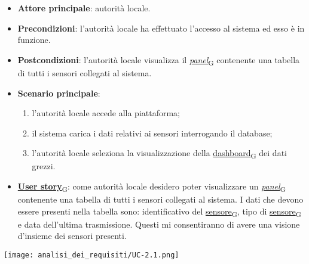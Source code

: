 \begin{itemize}
	\item \textbf{Attore principale}: autorità locale.
	\item \textbf{Precondizioni}: l'autorità locale ha effettuato l'accesso al sistema ed esso è in funzione.
	\item \textbf{Postcondizioni}: l'autorità locale visualizza il \href{https://7last.github.io/docs/rtb/documentazione-interna/glossario\#panel}{\textit{panel}\textsubscript{G}} contenente una tabella di tutti i sensori collegati al sistema.

	\item \textbf{Scenario principale}:
	      \begin{enumerate}
		      \item l'autorità locale accede alla piattaforma;
		      \item il sistema carica i dati relativi ai sensori interrogando il database;
		      \item l'autorità locale seleziona la visualizzazione della \href{https://7last.github.io/docs/rtb/documentazione-interna/glossario\#dashboard}{dashboard\textsubscript{G}} dei dati grezzi.
	      \end{enumerate}
	\item \href{https://7last.github.io/docs/rtb/documentazione-interna/glossario\#user-story}{\textbf{User story}\textsubscript{G}}: come autorità locale desidero poter visualizzare un \href{https://7last.github.io/docs/rtb/documentazione-interna/glossario\#panel}{\textit{panel}\textsubscript{G}} contenente una tabella di tutti i sensori collegati al sistema. I dati che devono essere presenti nella tabella sono: identificativo del \href{https://7last.github.io/docs/rtb/documentazione-interna/glossario\#sensore}{sensore\textsubscript{G}}, tipo di \href{https://7last.github.io/docs/rtb/documentazione-interna/glossario\#sensore}{sensore\textsubscript{G}} e data dell'ultima trasmissione. Questi mi consentiranno di avere una visione d'insieme dei sensori presenti.

\end{itemize}
\begin{center}
	\texttt{[image: analisi\_dei\_requisiti/UC-2.1.png]}
\end{center}

